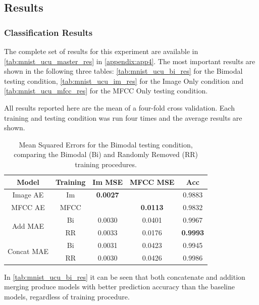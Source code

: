 \subsection{Results}

\subsubsection{Classification Results}
The complete set of results for this experiment are available in \autoref{tab:mnist_ucu_master_res} in \autoref{appendix:app4}. The most important results are shown in the following three tables: \autoref{tab:mnist_ucu_bi_res} for the Bimodal testing condition, \autoref{tab:mnist_ucu_im_res} for the Image Only condition and \autoref{tab:mnist_ucu_mfcc_res} for the \ac{MFCC} Only testing condition. 

All results reported here are the mean of a four-fold cross validation. Each training and testing condition was run four times and the average results are shown.


\begin{table}[h]
	\centering
		\begin{tabular}{|c|c|c|c|c|}
		\hline
		\textbf{Model} & \textbf{Training} & \textbf{Im MSE} & \textbf{MFCC MSE} &  \textbf{Acc} \\ \hline
				Image AE & Im & 	\textbf{0.0027}	&	       			& 	0.9883			\\ \hline		
				MFCC AE & MFCC & 		    		& 	\textbf{0.0113} &	0.9832			\\ \hline		
\multirow{2}{*}{Add MAE} & Bi & 	0.0030			&	0.0401			&	0.9967			\\ \cline{2-5}
						  & RR &	0.0033			&	0.0176			&	\textbf{0.9993}	\\ \hline	
		
\multirow{2}{*}{Concat MAE} & Bi & 0.0031			&	0.0423			&	0.9945			\\ \cline{2-5}		
							 & RR & 0.0030			&	0.0426			&	0.9986			\\ \hline
		\end{tabular}
		\caption{Mean Squared Errors for the Bimodal testing condition, comparing the Bimodal (Bi) and Randomly Removed (RR) training procedures.}
		\label{tab:mnist_ucu_bi_res}

\end{table}

In \autoref{tab:mnist_ucu_bi_res} it can be seen that both concatenate and addition merging produce models with better prediction accuracy than the baseline models, regardless of training procedure.

